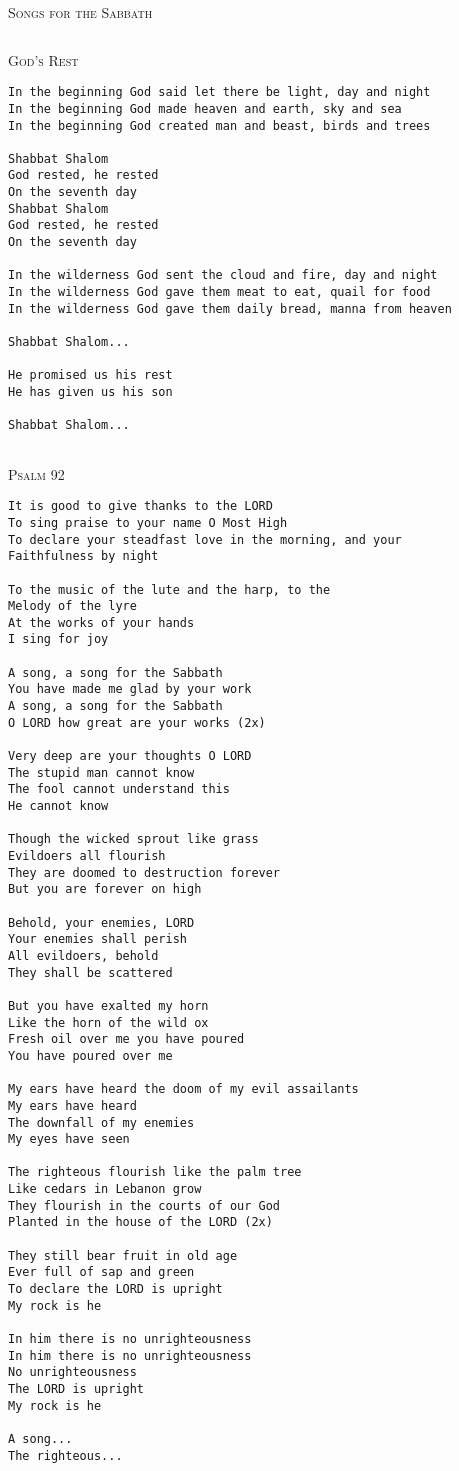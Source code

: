 \documentclass[10pt,oneside,footinclude=true,headinclude=true]{scrbook} %
\makeatletter
\newcommand{\verbatimfont}[1]{\renewcommand{\verbatim@font}{#1}}
\newcommand\songtitle[1]{
	\hspace*{-3.7mm}\Large\textsc{#1}
}
\makeatother
\begin{document}
\verbatimfont{\rmfamily\large}

\songtitle{Songs for the Sabbath}

\begin{verbatim}
\end{verbatim}

\songtitle{God's Rest}
\begin{verbatim}
In the beginning God said let there be light, day and night
In the beginning God made heaven and earth, sky and sea
In the beginning God created man and beast, birds and trees

Shabbat Shalom
God rested, he rested
On the seventh day
Shabbat Shalom
God rested, he rested
On the seventh day

In the wilderness God sent the cloud and fire, day and night
In the wilderness God gave them meat to eat, quail for food
In the wilderness God gave them daily bread, manna from heaven

Shabbat Shalom...

He promised us his rest
He has given us his son

Shabbat Shalom...


\end{verbatim}

\songtitle{Psalm 92}
\begin{verbatim}
It is good to give thanks to the LORD
To sing praise to your name O Most High
To declare your steadfast love in the morning, and your
Faithfulness by night

To the music of the lute and the harp, to the
Melody of the lyre
At the works of your hands
I sing for joy

A song, a song for the Sabbath
You have made me glad by your work
A song, a song for the Sabbath
O LORD how great are your works (2x)

Very deep are your thoughts O LORD
The stupid man cannot know
The fool cannot understand this
He cannot know

Though the wicked sprout like grass
Evildoers all flourish
They are doomed to destruction forever
But you are forever on high

Behold, your enemies, LORD
Your enemies shall perish
All evildoers, behold
They shall be scattered

But you have exalted my horn
Like the horn of the wild ox
Fresh oil over me you have poured
You have poured over me

My ears have heard the doom of my evil assailants
My ears have heard
The downfall of my enemies
My eyes have seen

The righteous flourish like the palm tree
Like cedars in Lebanon grow
They flourish in the courts of our God
Planted in the house of the LORD (2x)

They still bear fruit in old age
Ever full of sap and green
To declare the LORD is upright
My rock is he

In him there is no unrighteousness
In him there is no unrighteousness
No unrighteousness
The LORD is upright
My rock is he

A song...
The righteous...
\end{verbatim}
\end{document}

